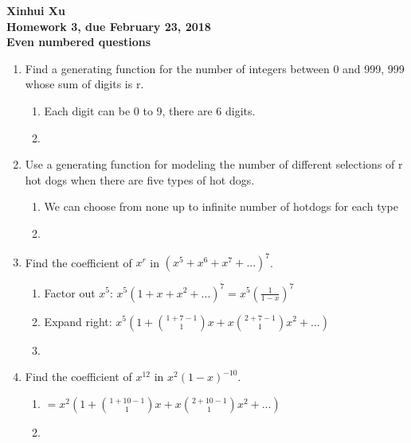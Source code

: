 \documentclass[12pt]{amsart}
\begin{document}
\begin{center}
  \bfseries
  Xinhui Xu\\
  Homework 3, due February 23, 2018\\
  Even numbered questions
\end{center}

\bigskip

\begin{enumerate}
\item  Find a generating function for the number of integers between 0 and 999, 999
whose sum of digits is r.
\begin{enumerate}
    \item Each digit can be 0 to 9, there are 6 digits.
    \item {}
\end{enumerate}
      

\item Use a generating function for modeling the number of different selections of r
hot dogs when there are five types of hot dogs.
    \begin{enumerate}
        \item We can choose from none up to infinite number of hotdogs for each type
        \item {}
    \end{enumerate}
    
\item Find the coefficient of $x^r$ in $(x^5+x^6+x^7+...)^7$.
    \begin{enumerate}
        \item Factor out $x^5$: $x^5(1+x+x^2+...)^7=x^5(\frac{1}{1-x})^7$
        \item Expand right: $x^5(1+\binom{1+7-1}{1}x+x\binom{2+7-1}{1}x^2+...)$
        \item {}
    \end{enumerate}

\item Find the coefficient of $x^{12}$ in $x^2(1-x)^{-10}$.
\begin{enumerate}
    \item $=x^2(1+\binom{1+10-1}{1}x+x\binom{2+10-1}{1}x^2+...)$
    \item {}
\end{enumerate}



\end{enumerate}
\end{document}
